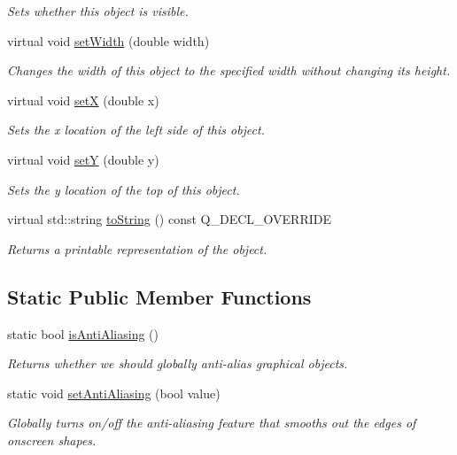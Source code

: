 \begin{DoxyCompactItemize}
\begin{DoxyCompactList}\small\item\em Sets whether this object is visible. \end{DoxyCompactList}\item 
virtual void \mbox{\hyperlink{classGObject_aa3f3fba4cb131baa8696ba01e3bceca1}{set\+Width}} (double width)
\begin{DoxyCompactList}\small\item\em Changes the width of this object to the specified width without changing its height. \end{DoxyCompactList}\item 
virtual void \mbox{\hyperlink{classGObject_a9c18fcc579333bf9653d13ad2b372e39}{setX}} (double x)
\begin{DoxyCompactList}\small\item\em Sets the x location of the left side of this object. \end{DoxyCompactList}\item 
virtual void \mbox{\hyperlink{classGObject_a7d57e2a5c35d27feb58fd498a3cf82b9}{setY}} (double y)
\begin{DoxyCompactList}\small\item\em Sets the y location of the top of this object. \end{DoxyCompactList}\item 
virtual std\+::string \mbox{\hyperlink{classGCompound_add86bda25fd0c3b8edaedee9431b85e6}{to\+String}} () const Q\+\_\+\+D\+E\+C\+L\+\_\+\+O\+V\+E\+R\+R\+I\+DE
\begin{DoxyCompactList}\small\item\em Returns a printable representation of the object. \end{DoxyCompactList}\end{DoxyCompactItemize}
\subsection*{Static Public Member Functions}
\begin{DoxyCompactItemize}
\item 
static bool \mbox{\hyperlink{classGObject_a93be0e1fe1b1bf1a1da732470c94f42b}{is\+Anti\+Aliasing}} ()
\begin{DoxyCompactList}\small\item\em Returns whether we should globally anti-\/alias graphical objects. \end{DoxyCompactList}\item 
static void \mbox{\hyperlink{classGObject_a1e43371668ae850193cebedb44e1bbe3}{set\+Anti\+Aliasing}} (bool value)
\begin{DoxyCompactList}\small\item\em Globally turns on/off the anti-\/aliasing feature that smooths out the edges of onscreen shapes. \end{DoxyCompactList}\end{DoxyCompactItemize}
